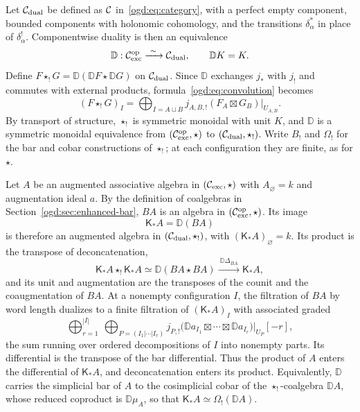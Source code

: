 Let\label{ogd:def:holonomic-dual-category} \(\mathcal C_{\mathrm{dual}}\) be defined as \(\mathcal C\) in~\eqref{ogd:eq:category}, with a perfect empty component, bounded components with holonomic cohomology, and the transitions \(\delta_\alpha^*\) in place of \(\delta_\alpha^!\).
Componentwise duality is then an equivalence
\[
 \mathbb D:\ogdcC_{\mathrm{exc}}^{\mathrm{op}}\xrightarrow{\ \sim\ }\ogdcC_{\mathrm{dual}},
 \qquad \mathbb DK=K.
\]
Define\label{ogd:def:holonomic-dual-convolution} \(F\star_!G=\mathbb D(\mathbb DF\star\mathbb DG)\) on \(\mathcal C_{\mathrm{dual}}\).
Since \(\mathbb D\) exchanges \(j_*\) with \(j_!\) and commutes with external products, formula~\eqref{ogd:eq:convolution} becomes
\begin{equation}\label{ogd:eq:shriek-convolution}
 (F\star_!G)_I=
 \bigoplus_{I=A\sqcup B}
 j_{A,B,!}(F_A\boxtimes G_B)|_{U_{A,B}}.
\end{equation}
By transport of structure, \(\star_!\) is symmetric monoidal with unit \(K\), and \(\mathbb D\) is a symmetric monoidal equivalence from \((\mathcal C_{\mathrm{exc}}^{\mathrm{op}},\star)\) to \((\mathcal C_{\mathrm{dual}},\star_!)\).
Write\label{ogd:def:shriek-bar-and-cobar} \(B_!\) and \(\Omega_!\) for the bar and cobar constructions of \(\star_!\); at each configuration they are finite, as for \(\star\).

\begin{construction}\label{ogd:con:koszul-dual}
Let \(A\) be an augmented associative algebra in \((\mathcal C_{\mathrm{exc}},\star)\) with \(A_\varnothing=k\) and augmentation ideal \(a\).
By the definition of coalgebras in Section~\ref{ogd:sec:enhanced-bar}, \(BA\) is an algebra in \((\mathcal C_{\mathrm{exc}}^{\mathrm{op}},\star)\).
Its image
\[
 \mathsf K_*A=\mathbb D(BA)
\]
is therefore an augmented algebra in \((\mathcal C_{\mathrm{dual}},\star_!)\), with \((\mathsf K_*A)_\varnothing=k\).
Its product is the transpose of deconcatenation,
\[
 \mathsf K_*A\star_!\mathsf K_*A\simeq\mathbb D(BA\star BA)
 \xrightarrow{\ \mathbb D\Delta_{BA}\ }\mathsf K_*A,
\]
and its unit and augmentation are the transposes of the counit and the coaugmentation of \(BA\).
At a nonempty configuration \(I\), the filtration of \(BA\) by word length dualizes to a finite filtration of \((\mathsf K_*A)_I\) with associated graded
\[
 \bigoplus_{r=1}^{|I|}\ \bigoplus_{P=(I_1|\cdots|I_r)}
 j_{P,!}\bigl(\mathbb Da_{I_1}\boxtimes\cdots\boxtimes\mathbb Da_{I_r}\bigr)|_{U_P}[-r],
\]
the sum running over ordered decompositions of \(I\) into nonempty parts.
Its differential is the transpose of the bar differential.
Thus the product of \(A\) enters the differential of \(\mathsf K_*A\), and deconcatenation enters its product.
Equivalently, \(\mathbb D\) carries the simplicial bar of \(A\) to the cosimplicial cobar of the \(\star_!\)-coalgebra \(\mathbb DA\), whose reduced coproduct is \(\mathbb D\mu_A\), so that \(\mathsf K_*A\simeq\Omega_!(\mathbb DA)\).
\end{construction}

